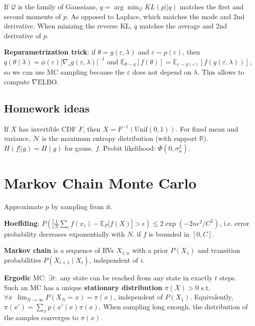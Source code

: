 \documentclass[11pt,landscape,a4paper,fleqn]{article}
\begin{document}
\begin{multicols*}{4}
If \(\mathcal{Q}\) is the family of Gaussians, \(q = \arg\min_{\mathcal{Q}} KL(p||q)\) matches the first and second moments of \(p\).
As opposed to Laplace, which matches the mode and 2nd derivative.
When minizing the reverse KL, \(q\) matches the average and 2nd derivative of \(p\).

\textbf{Reparametrization trick}: if \(\theta = g(\varepsilon, \lambda)\) and \(\varepsilon \sim p(\varepsilon)\),
then \(q(\theta \mid \lambda) = \phi(\varepsilon) |\nabla_\varepsilon g(\varepsilon, \lambda)|^{-1}\)
and \(\mathbb{E}_{\theta \sim q} [f(\theta)] = \mathbb{E}_{\varepsilon \sim p(\varepsilon)} [f(g(\varepsilon, \lambda))]\),
so we can use MC sampling because the \(\varepsilon\) does not depend on \(\lambda\).
This allows to compute \(\nabla \mathrm{ELBO}\).

\subsection{Homework ideas}

If \(X\) has invertible CDF \(F\), then \(X = F^{-1}(\mathrm{Unif}(0, 1))\).
For fixed mean and variance, \(\mathcal{N}\) is the maximum entropy distribution (with support \(\mathbb{R}\)).
\(H(f || g) = H(g)\) for gauss. \(f\).
Probit likelihood: \(\Phi(0, \sigma_n^2)\).

\section{Markov Chain Monte Carlo}

Approximate \(p\) by sampling from it.

\textbf{Hoeffding}: 
\(P(|\frac{1}{N} \sum_i f(x_i) - \mathbb{E}_P[f(X)| > \epsilon) \leq 2 \exp( - 2n\epsilon^2 / C^2)\),
i.e. error probability decreases exponentially with \(N\).
if \(f\) is bounded in \([0, C]\).

\textbf{Markov chain} is a sequence of RVs \(X_{1:n}\) with a prior \(P(X_1)\) and transition probabilities \(P(X_{i+1} \mid X_i)\),
independent of \(i\).

\textbf{Ergodic} MC: \(\exists t : \) any state can be reached from any state in exactly \(t\) steps.
Such an MC has a unique \textbf{stationary distribution} \(\pi(X) > 0\) s.t.
\(\forall x \ \ \lim_{N \to \infty} P(X_N = x) = \pi(x)\), independent of \(P(X_1)\).
Equivalently, \(\pi(x') = \sum_x p(x' \mid x) \pi(x)\).
When sampling long enough, the distribution of the samples converges to \(\pi(x)\).


\end{multicols*}
\end{document}
